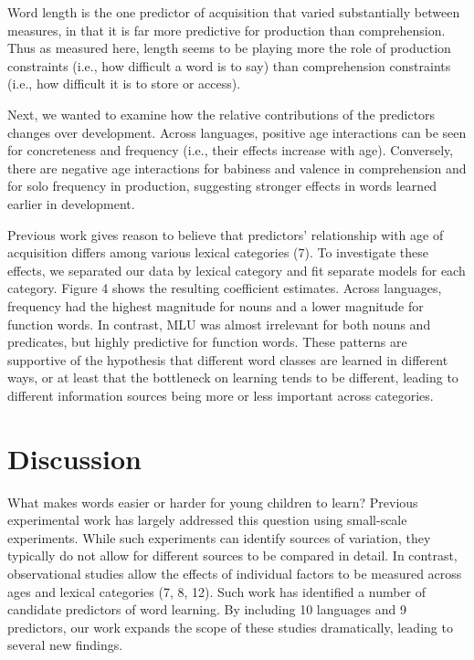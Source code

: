 \documentclass[english,man]{apa6}
\theoremstyle{definition}
\theoremstyle{definition}
\theoremstyle{definition}
\theoremstyle{remark}
\begin{document}
Word length is the one predictor of acquisition that varied
substantially between measures, in that it is far more predictive for
production than comprehension. Thus as measured here, length seems to be
playing more the role of production constraints (i.e., how difficult a
word is to say) than comprehension constraints (i.e., how difficult it
is to store or access).

Next, we wanted to examine how the relative contributions of the
predictors changes over development. Across languages, positive age
interactions can be seen for concreteness and frequency (i.e., their
effects increase with age). Conversely, there are negative age
interactions for babiness and valence in comprehension and for solo
frequency in production, suggesting stronger effects in words learned
earlier in development.

Previous work gives reason to believe that predictors' relationship with
age of acquisition differs among various lexical categories (7). To
investigate these effects, we separated our data by lexical category and
fit separate models for each category. Figure 4 shows the resulting
coefficient estimates. Across languages, frequency had the highest
magnitude for nouns and a lower magnitude for function words. In
contrast, MLU was almost irrelevant for both nouns and predicates, but
highly predictive for function words. These patterns are supportive of
the hypothesis that different word classes are learned in different
ways, or at least that the bottleneck on learning tends to be different,
leading to different information sources being more or less important
across categories.

\section*{Discussion}\label{discussion}

What makes words easier or harder for young children to learn? Previous
experimental work has largely addressed this question using small-scale
experiments. While such experiments can identify sources of variation,
they typically do not allow for different sources to be compared in
detail. In contrast, observational studies allow the effects of
individual factors to be measured across ages and lexical categories (7,
8, 12). Such work has identified a number of candidate predictors of
word learning. By including 10 languages and 9 predictors, our work
expands the scope of these studies dramatically, leading to several new
findings.
\end{document}
